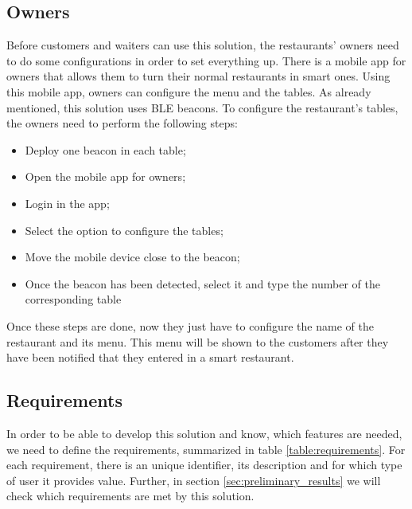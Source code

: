 \subsection{Owners}
\label{sub:owners}
Before customers and waiters can use this solution, the restaurants' owners
need to do some configurations in order to set everything up.
There is a mobile app for owners that allows them to turn their normal
restaurants in smart ones.
Using this mobile app, owners can configure the menu and the tables.
As already mentioned, this solution uses BLE beacons. To configure
the restaurant's tables, the owners need to perform the following steps:
\begin{itemize}
  \item Deploy one beacon in each table;
  \item Open the mobile app for owners;
  \item Login in the app;
  \item Select the option to configure the tables;
  \item Move the mobile device close to the beacon;
  \item Once the beacon has been detected, select it and type the number
  of the corresponding table
\end{itemize}
Once these steps are done, now they just have to configure the name of the
restaurant and its menu. This menu will be shown to the customers after they
have been notified that they entered in a smart restaurant.

\subsection{Requirements}
\label{sub:requirements}
In order to be able to develop this solution and know, which features are
needed, we need to define the requirements, summarized in table
\ref{table:requirements}. For each requirement, there is an unique
identifier, its description and for which type of user it provides value.
Further, in section \ref{sec:preliminary_results} we will check which
requirements are met by this solution.

